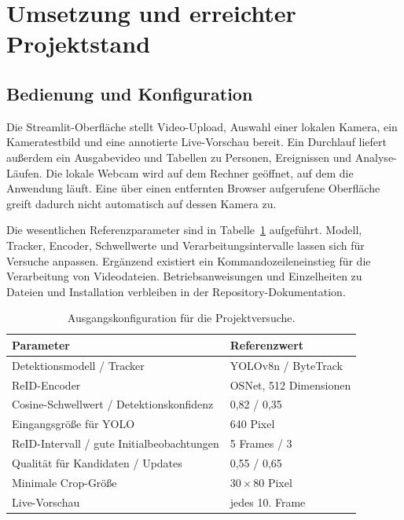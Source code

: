 \documentclass[runningheads]{llncs}
\begin{document}
\section{Umsetzung und erreichter Projektstand}
\label{sec:implementation}

\subsection{Bedienung und Konfiguration}

Die Streamlit-Oberfläche stellt Video-Upload, Auswahl einer lokalen Kamera, ein Kameratestbild und eine annotierte Live-Vorschau bereit. Ein Durchlauf liefert au{\ss}erdem ein Ausgabevideo und Tabellen zu Personen, Ereignissen und Analyse-Läufen. Die lokale Webcam wird auf dem Rechner geöffnet, auf dem die Anwendung läuft. Eine über einen entfernten Browser aufgerufene Oberfläche greift dadurch nicht automatisch auf dessen Kamera zu.

Die wesentlichen Referenzparameter sind in Tabelle~\ref{tab:defaults} aufgeführt. Modell, Tracker, Encoder, Schwellwerte und Verarbeitungsintervalle lassen sich für Versuche anpassen. Ergänzend existiert ein Kommandozeileneinstieg für die Verarbeitung von Videodateien. Betriebsanweisungen und Einzelheiten zu Dateien und Installation verbleiben in der Repository-Dokumentation.

\begin{table}[tbp]
\caption{Ausgangskonfiguration für die Projektversuche.}
\label{tab:defaults}
\centering
\small
\begin{tabularx}{\linewidth}{@{}Xl@{}}
\toprule
Parameter & Referenzwert \\
\midrule
Detektionsmodell / Tracker & YOLOv8n / ByteTrack \\
ReID-Encoder & OSNet, 512 Dimensionen \\
Cosine-Schwellwert / Detektionskonfidenz & 0,82 / 0,35 \\
Eingangsgrö{\ss}e für YOLO & 640 Pixel \\
ReID-Intervall / gute Initialbeobachtungen & 5 Frames / 3 \\
Qualität für Kandidaten / Updates & 0,55 / 0,65 \\
Minimale Crop-Grö{\ss}e & $30\times80$ Pixel \\
Live-Vorschau & jedes 10. Frame \\
\bottomrule
\end{tabularx}
\end{table}
\end{document}
